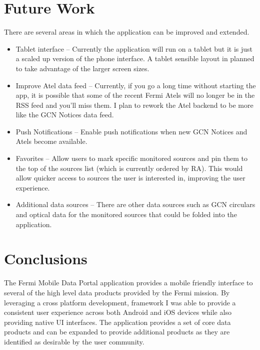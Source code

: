 \section{Future Work}
There are several areas in which the application can be improved and extended. 
\begin{itemize}
\item{Tablet interface -- Currently the application will run on a tablet but it is just a scaled up version of the phone interface.  A tablet sensible layout in planned to take advantage of the larger screen sizes.}
\item{Improve Atel data feed -- Currently, if you go a long time without starting the app, it is possible that some of the recent Fermi Atels will no longer be in the RSS feed and you'll miss them.  I plan to rework the Atel backend to be more like the GCN Notices data feed.}
\item{Push Notifications -- Enable push notifications when new GCN Notices and Atels become available.}
\item{Favorites -- Allow users to mark specific monitored sources and pin them to the top of the sources list (which is currently ordered by RA). This would allow quicker access to sources the user is interested in, improving the user experience.}
\item{Additional data sources -- There are other data sources such as GCN circulars and optical data for the monitored sources that could be folded into the application.}
\end{itemize}

\section{Conclusions}
The Fermi Mobile Data Portal application provides a mobile friendly interface to several of the high level data products provided by the Fermi mission.  By leveraging a cross platform development, framework I was able to provide a consistent user experience across both Android and iOS devices while also providing native UI interfaces.  The application provides a set of core data products and can be expanded to provide additional products as they are identified as desirable by the user community.

